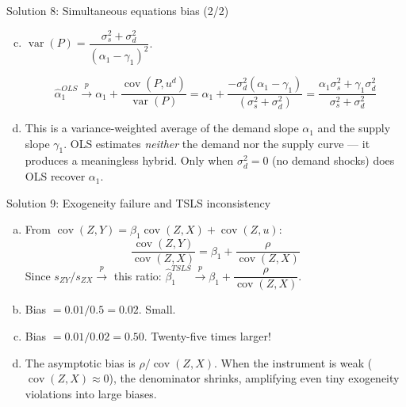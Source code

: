 \documentclass[10pt]{beamer}
\begin{document}
\begin{frame}{Solution 8: Simultaneous equations bias (2/2)}
\label{s8b}
\begin{enumerate}[(a)]
  \setcounter{enumi}{2}
  \item $\operatorname{var}(P) = \dfrac{\sigma_s^2 + \sigma_d^2}{(\alpha_1 - \gamma_1)^2}$.

  \[
  \widehat{\alpha}_1^{OLS} \xrightarrow{p} \alpha_1 + \frac{\operatorname{cov}(P,u^d)}{\operatorname{var}(P)} = \alpha_1 + \frac{-\sigma_d^2(\alpha_1 - \gamma_1)}{(\sigma_s^2+\sigma_d^2)} = \frac{\alpha_1\sigma_s^2 + \gamma_1\sigma_d^2}{\sigma_s^2 + \sigma_d^2}
  \]

  \item This is a \alert{variance-weighted average} of the demand slope $\alpha_1$ and the supply slope $\gamma_1$. OLS estimates \emph{neither} the demand nor the supply curve --- it produces a meaningless hybrid. Only when $\sigma_d^2 = 0$ (no demand shocks) does OLS recover $\alpha_1$.
\end{enumerate}

\vfill
\hfill\hyperlink{q8}{}
\end{frame}

\begin{frame}{Solution 9: Exogeneity failure and TSLS inconsistency}
\label{s9}
\begin{enumerate}[(a)]
  \item From $\operatorname{cov}(Z, Y) = \beta_1\operatorname{cov}(Z,X) + \operatorname{cov}(Z,u)$:
  \[
  \frac{\operatorname{cov}(Z,Y)}{\operatorname{cov}(Z,X)} = \beta_1 + \frac{\rho}{\operatorname{cov}(Z,X)}
  \]
  Since $s_{ZY}/s_{ZX} \xrightarrow{p}$ this ratio: $\widehat{\beta}_1^{TSLS} \xrightarrow{p} \beta_1 + \dfrac{\rho}{\operatorname{cov}(Z,X)}$. \checkmark

  \item Bias $= 0.01/0.5 = \boxed{0.02}$. Small.

  \item Bias $= 0.01/0.02 = \boxed{0.50}$. Twenty-five times larger!

  \item The asymptotic bias is $\rho/\operatorname{cov}(Z,X)$. When the instrument is weak ($\operatorname{cov}(Z,X) \approx 0$), the denominator shrinks, \alert{amplifying} even tiny exogeneity violations into large biases.
\end{enumerate}

\vfill
\hfill\hyperlink{q9}{}
\end{frame}
\end{document}
